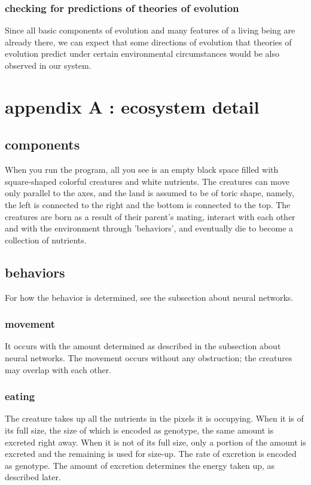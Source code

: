 \documentclass{article}
\numberwithin{equation}{section}
\begin{document}
\subsubsection{checking for predictions of theories of evolution}
Since all basic components of evolution and many features of a living being are already there, we can expect that some directions of evolution that theories of evolution predict under certain environmental circumstances would be also observed in our system.    

\section{appendix A : ecosystem detail}
\subsection{components}
When you run the program, all you see is an empty black space filled with square-shaped  colorful creatures and white nutrients. The creatures can move only parallel to the axes, and the land is assumed to be of toric shape, namely, the left is connected to the right and the bottom is connected to the top. The creatures are born as a result of their parent's mating, interact with each other  and with the environment through 'behaviors', and eventually die to become a collection of nutrients.
\subsection{behaviors}
For how the behavior is determined, see the subsection about neural networks. 
\subsubsection{movement}
It occurs with the amount determined as described in the subsection about neural networks. The movement occurs without any obstruction; the creatures may overlap with each other. 
\subsubsection{eating}
The creature takes up all the nutrients in the pixels it is occupying. When it is of its full size, the size of which is encoded as genotype, the same amount is excreted right away. When it is not of its full size, only a portion of the amount is excreted and the remaining is used for size-up. The rate of excretion is encoded as genotype. The amount of excretion determines the energy taken up, as described later. 
\end{document}
